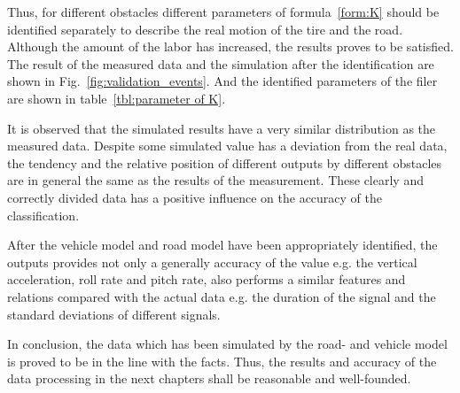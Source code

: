  Thus, for different obstacles different parameters of formula~\ref{form:K} should be identified separately to describe the real motion of the tire and the road.
 Although the amount of the labor has increased, the results proves to be satisfied. 
 The result of the measured data and the simulation after the identification are shown in Fig.~\ref{fig:validation_events}.
 And the identified parameters of the filer are shown in table~\ref{tbl:parameter of K}. 
 
 It is observed that the simulated results have a very similar distribution as the measured data. 
 Despite some simulated value has a deviation from the real data, the tendency and the relative position of different outputs by different obstacles are in general the same as the results of the measurement.
 These clearly and correctly divided data has a positive influence on the accuracy of the classification.
 
 After the vehicle model and road model have been appropriately identified, the outputs provides not only a generally accuracy of the value e.g. the vertical acceleration, roll rate and pitch rate, also performs a similar features and relations compared with the actual data e.g. the duration of the signal and the standard deviations of different signals.
 
 In conclusion, the data which has been simulated by the road- and vehicle model is proved to be in the line with the facts.
 Thus, the results and accuracy of the data processing in the next chapters shall be reasonable and well-founded.
 
 
 